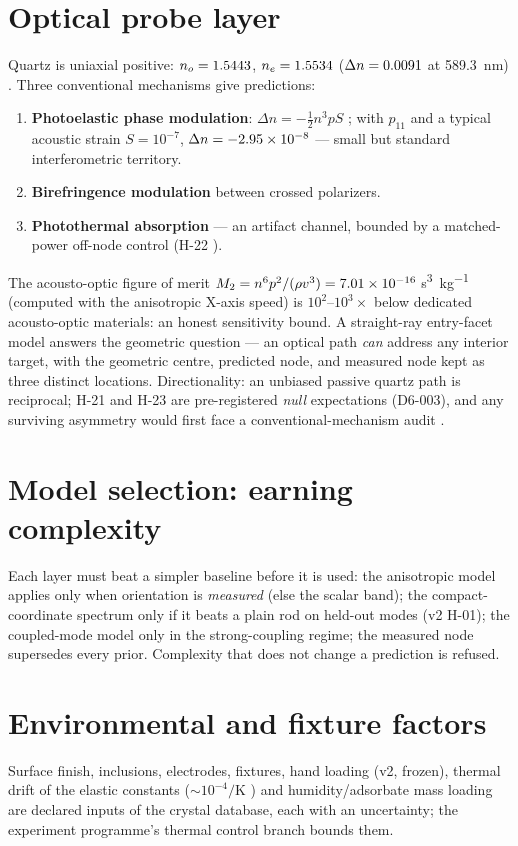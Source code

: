 \documentclass[10pt,letterpaper]{article}
\begin{document}
\section{Optical probe layer}
Quartz is uniaxial positive: $n_o = 1.5443$, $n_e = 1.5534$
($\Delta n = 0.0091$ at \SI{589.3}{\nano\meter})
\citep{hecht2017}. Three conventional mechanisms give \DER{}
predictions:
\begin{enumerate}
\item \textbf{Photoelastic phase modulation}: $\Delta n = -\tfrac12 n^3
p S$ \citep{narasimhamurty1981}; with $p_{11}$ and a typical acoustic
strain $S = 10^{-7}$, $\Delta n = \num{-2.95e-08}$ --- small but standard
interferometric territory.
\item \textbf{Birefringence modulation} between crossed polarizers.
\item \textbf{Photothermal absorption} --- an artifact channel, bounded
by a matched-power off-node control (H-22 \ENG).
\end{enumerate}
The acousto-optic figure of merit $M_2 = n^6 p^2/(\rho v^3) = \num{7.01e-16}$
\si{\second\cubed\per\kilogram} (computed with the anisotropic X-axis
speed) is $10^2$--$10^3\times$ below dedicated acousto-optic materials:
an honest sensitivity bound. A straight-ray entry-facet model answers
the geometric question --- an optical path \emph{can} address any
interior target, with the geometric centre, predicted node, and measured
node kept as three distinct locations. Directionality: an unbiased
passive quartz path is reciprocal; H-21 and H-23 are pre-registered
\emph{null} expectations (D6-003), and any surviving asymmetry would
first face a conventional-mechanism audit
\citep{wang2025selfinduced,chao2025tmoke}.

\section{Model selection: earning complexity}\label{sec:model}
Each layer must beat a simpler baseline before it is used: the
anisotropic model applies only when orientation is \emph{measured}
(else the scalar band); the compact-coordinate spectrum only if it beats
a plain rod on held-out modes (v2 H-01); the coupled-mode model only in
the strong-coupling regime; the measured node supersedes every prior.
Complexity that does not change a prediction is refused.

\section{Environmental and fixture factors}
Surface finish, inclusions, electrodes, fixtures, hand loading (v2,
frozen), thermal drift of the elastic constants
($\sim 10^{-4}/\mathrm{K}$ \DER) and humidity/adsorbate mass loading are
declared inputs of the crystal database, each with an uncertainty; the
experiment programme's thermal control branch bounds them.
\end{document}
